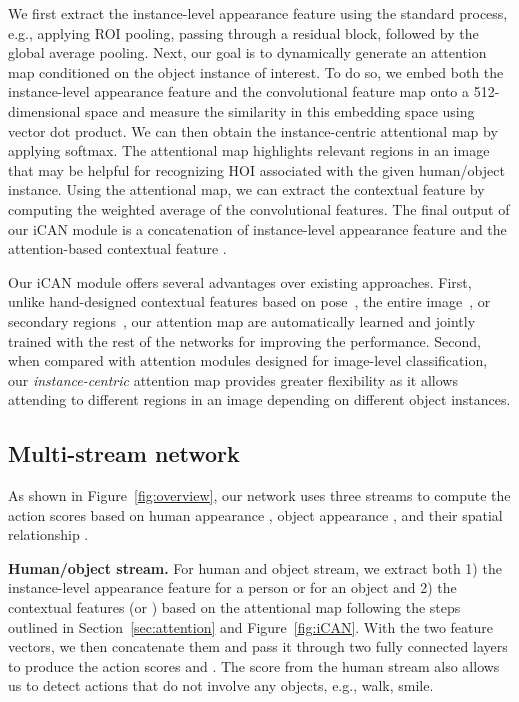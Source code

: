 \documentclass{bmvc2k}
\newlength\secmargin
\newcommand {\para}[1]{\vspace{1.5mm} \noindent \textbf{#1}}
\newcommand{\secref}[1]{Section~\ref{sec:#1}}
\newcommand{\figref}[1]{Figure~\ref{fig:#1}}
\begin{document}
We first extract the instance-level appearance feature  using the standard process, e.g., applying ROI pooling, passing through a residual block, followed by the global average pooling. 
Next, our goal is to dynamically generate an attention map conditioned on the object instance of interest. 
To do so, we embed both the instance-level appearance feature  and the convolutional feature map onto a 512-dimensional space and measure the similarity in this embedding space using vector dot product.
We can then obtain the instance-centric attentional map by applying softmax. 
The attentional map highlights relevant regions in an image that may be helpful for recognizing HOI associated with the given human/object instance.
Using the attentional map, we can extract the contextual feature  by computing the weighted average of the convolutional features.
The final output of our iCAN module is a concatenation of instance-level appearance feature  and the attention-based contextual feature .

Our iCAN module offers several advantages over existing approaches.
First, unlike hand-designed contextual features based on pose~\cite{Cheron-ICCV-PCNN}, the entire image~\cite{Mallya-ECCV-Interactions}, or secondary regions~\cite{Gkioxari-ICCV-R*CNN}, our attention map are automatically learned and jointly trained with the rest of the networks for improving the performance.
Second, when compared with attention modules designed for image-level classification, our \emph{instance-centric} attention map provides greater flexibility as it allows attending to different regions in an image depending on different object instances.



\vspace{\secmargin}
\subsection{Multi-stream network}
\label{sec:multi-stream}
\vspace{\secmargin}



As shown in \figref{overview}, our network uses three streams to compute the action scores based on human appearance , object appearance , and their spatial relationship .


\para{Human/object stream.} For human and object stream,  we extract both 
1) the instance-level appearance feature  for a person or  for an object and 
2) the contextual features  (or ) based on the  attentional map following the steps outlined in \secref{attention} and \figref{iCAN}.
With the two feature vectors, we then concatenate them and pass it through two fully connected layers to produce the action scores  and .
The score  from the human stream also allows us to detect actions that do not involve any objects, e.g., walk, smile.
\end{document}
